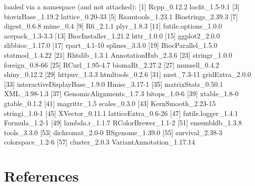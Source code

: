 \documentclass[12pt]{report}
\renewenvironment{Schunk}{\vspace{0pt}}{\vspace{0pt}}
\begin{document}
\begin{Schunk}
\begin{Soutput}
loaded via a namespace (and not attached):
 [1] Rcpp_0.12.2                  locfit_1.5-9.1              
 [3] biovizBase_1.19.2            lattice_0.20-33             
 [5] Rsamtools_1.23.1             Biostrings_2.39.3           
 [7] digest_0.6.8                 mime_0.4                    
 [9] R6_2.1.1                     plyr_1.8.3                  
[11] futile.options_1.0.0         acepack_1.3-3.3             
[13] BiocInstaller_1.21.2         httr_1.0.0                  
[15] ggplot2_2.0.0                zlibbioc_1.17.0             
[17] rpart_4.1-10                 splines_3.3.0               
[19] BiocParallel_1.5.0           statmod_1.4.22              
[21] Rhtslib_1.3.1                AnnotationHub_2.3.6         
[23] stringr_1.0.0                foreign_0.8-66              
[25] RCurl_1.95-4.7               biomaRt_2.27.2              
[27] munsell_0.4.2                shiny_0.12.2                
[29] httpuv_1.3.3                 htmltools_0.2.6             
[31] nnet_7.3-11                  gridExtra_2.0.0             
[33] interactiveDisplayBase_1.9.0 Hmisc_3.17-1                
[35] matrixStats_0.50.1           XML_3.98-1.3                
[37] GenomicAlignments_1.7.3      bitops_1.0-6                
[39] xtable_1.8-0                 gtable_0.1.2                
[41] magrittr_1.5                 scales_0.3.0                
[43] KernSmooth_2.23-15           stringi_1.0-1               
[45] XVector_0.11.1               latticeExtra_0.6-26         
[47] futile.logger_1.4.1          Formula_1.2-1               
[49] lambda.r_1.1.7               RColorBrewer_1.1-2          
[51] ensembldb_1.3.8              tools_3.3.0                 
[53] dichromat_2.0-0              BSgenome_1.39.0             
[55] survival_2.38-3              colorspace_1.2-6            
[57] cluster_2.0.3                VariantAnnotation_1.17.14   
\end{Soutput}
\end{Schunk}

\section{References}



\end{document}
